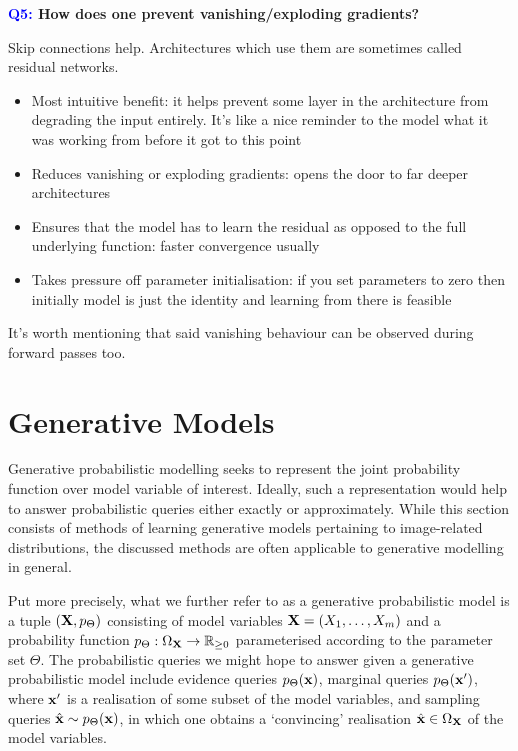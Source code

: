 \documentclass[11pt]{article}
\begin{document}
\begin{center}
    \textbf{\textcolor{blue}{Q5:} How does one prevent vanishing/exploding gradients?}
\end{center}
Skip connections help. Architectures which use them are sometimes called residual networks.
\begin{itemize}
    \item Most intuitive benefit: it helps prevent some layer in the architecture from degrading the input entirely. It's like a nice reminder to the model what it was working from before it got to this point
    \item Reduces vanishing or exploding gradients: opens the door to far deeper architectures
    \item Ensures that the model has to learn the residual as opposed to the full underlying function: faster convergence usually
    \item Takes pressure off parameter initialisation: if you set parameters to zero then initially model is just the identity and learning from there is feasible
\end{itemize}
It's worth mentioning that said vanishing behaviour can be observed during forward passes too.

\section{Generative Models}
Generative probabilistic modelling seeks to represent the joint probability function over model variable of interest. Ideally, such a representation would help to answer probabilistic queries either exactly or approximately. While this section consists of methods of learning generative models pertaining to image-related distributions, the discussed methods are often applicable to generative modelling in general.

Put more precisely, what we further refer to as a generative probabilistic model is a tuple $(\mathbf{X}, p_{\Theta})$ consisting of model variables $\mathbf{X}=(X_1,\dots,X_m)$ and a probability function $p_{\Theta}:\Omega_{\mathbf{X}}\rightarrow\mathbb{R}_{\geq0}$ parameterised according to the parameter set $\Theta$. The probabilistic queries we might hope to answer given a generative probabilistic model include evidence queries $p_{\Theta}(\mathbf{x})$, marginal queries $p_{\Theta}(\mathbf{x}')$, where $\mathbf{x}'$ is a realisation of some subset of the model variables, and sampling queries $\hat{\mathbf{x}}\sim p_{\Theta}(\mathbf{x})$, in which one obtains a `convincing' realisation $\hat{\mathbf{x}}\in\Omega_{\mathbf{X}}$ of the model variables.
\end{document}
